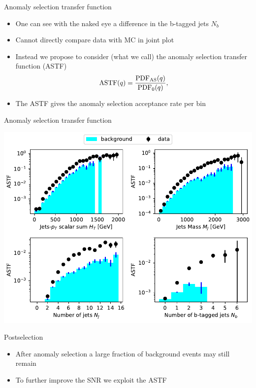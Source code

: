 \documentclass{beamer}
\begin{document}
\begin{frame}{Anomaly selection transfer function}
  \begin{itemize}
      \item<1-> One can see with the naked eye a difference in the b-tagged jets $N_b$
      \item<2-> Cannot directly compare data with MC in joint plot
      \item<3-> Instead we propose to consider (what we call) the anomaly selection transfer function (ASTF)
      \begin{equation}
      \textup{ASTF}(q) = \frac{\textup{PDF}_{\textup{AS}}(q)}{\textup{PDF}_{0}(q)},
      \end{equation}
      \item<4-> The ASTF gives the anomaly selection acceptance rate per bin
  \end{itemize}
\end{frame}

\begin{frame}{Anomaly selection transfer function}
    \begin{center}
     \includegraphics[width=1\textwidth]{astf.pdf}
    \end{center}
\end{frame}

\begin{frame}{Postselection}
\begin{itemize}
    \item<1-> After anomaly selection a large fraction of background events may still remain
\end{itemize}
\begin{itemize}
    \item<3-> To further improve the SNR we exploit the ASTF
\end{itemize}
\end{frame}
\end{document}
